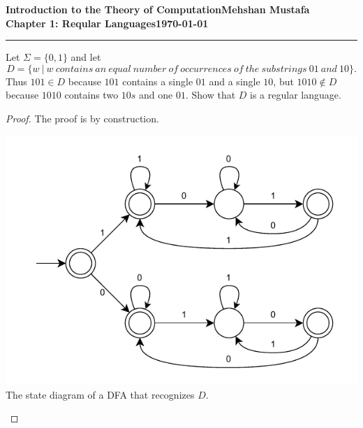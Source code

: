 \documentclass[11pt]{article}
\newcommand{\myname}{Mehshan Mustafa}
\newcommand{\dated}{\today}
\newenvironment{problem}[2][Problem]{\begin{trivlist}
\item[\hskip \labelsep {\bfseries #1}\hskip \labelsep {\bfseries #2.}]}{\end{trivlist}}
\begin{document}
\textbf{Introduction to the Theory of
Computation}\hfill\textbf{\myname}\\[0.01in]
\textbf{Chapter 1: Reqular Languages}\hfill\textbf{\dated}\\
\smallskip\hrule\bigskip

\begin{problem}{1.48}
Let $\Sigma = \{0,1\}$ and let
\[
D = \{w \ | \ w \ contains \ an \ equal \ number \ of \ occurrences \ of \ the \ substrings \ 01 \ and \ 10\}.
\]
Thus $101 \in D$ because $101$ contains a single $01$ and a single $10$, but $1010 \notin D$ because $1010$ contains two $10s$ and one $01$. Show that $D$ is a regular language.
\end{problem}

\begin{proof}
The proof is by construction.
\begin{center}
\includegraphics[scale=1.0]{Figures/Problem1.48.pdf} \\
The state diagram of a DFA that recognizes $D$.
\end{center}
\end{proof}
\end{document}
